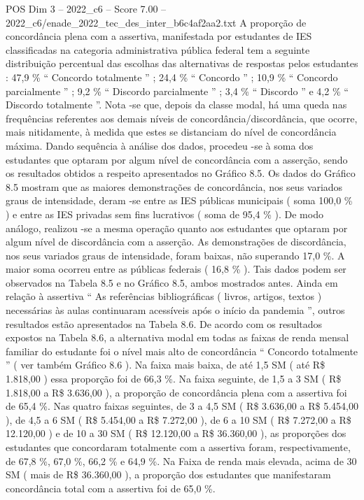 \begin{textsample}{POS Dim 3 – 2022\_c6 – Score 7.00 – 2022\_c6/enade\_2022\_tec\_des\_inter\_b6c4af2aa2.txt}
A proporção de concordância plena com a assertiva, manifestada por estudantes de IES classificadas na categoria administrativa pública federal tem a seguinte distribuição percentual das escolhas das alternativas de respostas pelos estudantes : 47,9 \% “ Concordo totalmente ” ; 24,4 \% “ Concordo ” ; 10,9 \% “ Concordo parcialmente ” ; 9,2 \% “ Discordo parcialmente ” ; 3,4 \% “ Discordo ” e 4,2 \% “ Discordo totalmente ”.
Nota -se que, depois da classe modal, há uma queda nas frequências referentes aos demais níveis de concordância/discordância, que ocorre, mais nitidamente, à medida que estes se distanciam do nível de concordância máxima.
Dando sequência à análise dos dados, procedeu -se à soma dos estudantes que optaram por algum nível de concordância com a asserção, sendo os resultados obtidos a respeito apresentados no Gráfico 8.5.
Os dados do Gráfico 8.5 mostram que as maiores demonstrações de concordância, nos seus variados graus de intensidade, deram -se entre as IES públicas municipais ( soma 100,0 \% ) e entre as IES privadas sem fins lucrativos ( soma de 95,4 \% ).
De modo análogo, realizou -se a mesma operação quanto aos estudantes que optaram por algum nível de discordância com a asserção.
As demonstrações de discordância, nos seus variados graus de intensidade, foram baixas, não superando 17,0 \%.
A maior soma ocorreu entre as públicas federais ( 16,8 \% ).
Tais dados podem ser observados na Tabela 8.5 e no Gráfico 8.5, ambos mostrados antes.
Ainda em relação à assertiva “ As referências bibliográficas ( livros, artigos, textos ) necessárias às aulas continuaram acessíveis após o início da pandemia ”, outros resultados estão apresentados na Tabela 8.6.
De acordo com os resultados expostos na Tabela 8.6, a alternativa modal em todas as faixas de renda mensal familiar do estudante foi o nível mais alto de concordância “ Concordo totalmente ” ( ver também Gráfico 8.6 ).
Na faixa mais baixa, de até 1,5 SM ( até R\$ 1.818,00 ) essa proporção foi de 66,3 \%.
Na faixa seguinte, de 1,5 a 3 SM ( R\$ 1.818,00 a R\$ 3.636,00 ), a proporção de concordância plena com a assertiva foi de 65,4 \%.
Nas quatro faixas seguintes, de 3 a 4,5 SM ( R\$ 3.636,00 a R\$ 5.454,00 ), de 4,5 a 6 SM ( R\$ 5.454,00 a R\$ 7.272,00 ), de 6 a 10 SM ( R\$ 7.272,00 a R\$ 12.120,00 ) e de 10 a 30 SM ( R\$ 12.120,00 a R\$ 36.360,00 ), as proporções dos estudantes que concordaram totalmente com a assertiva foram, respectivamente, de 67,8 \%, 67,0 \%, 66,2 \% e 64,9 \%.
Na Faixa de renda mais elevada, acima de 30 SM ( mais de R\$ 36.360,00 ), a proporção dos estudantes que manifestaram concordância total com a assertiva foi de 65,0 \%.

\end{textsample}
